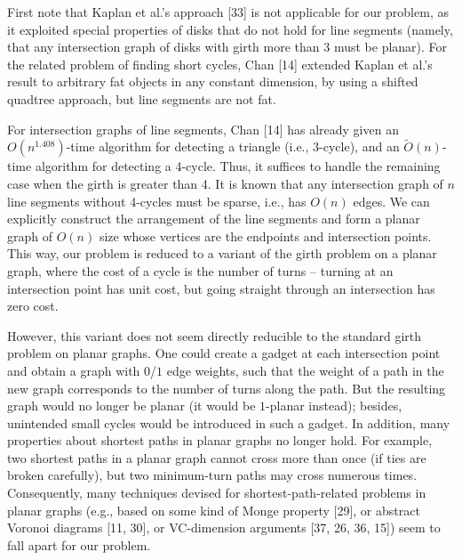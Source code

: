 First note that Kaplan et al.’s approach [33] is not applicable for our problem, as it exploited special properties of disks that do not hold for line segments (namely, that any intersection graph of disks with girth more than 3 must be planar). For the related problem of finding short cycles, Chan [14] extended Kaplan et al.’s result to arbitrary fat objects in any constant dimension, by using a shifted quadtree approach, but line segments are not fat.
\par
\par
For intersection graphs of line segments, Chan [14] has already given an $O(n^{1.408})$-time algorithm for detecting a triangle (i.e., 3-cycle), and an $\widetilde{O}(n)$-time algorithm for detecting a 4-cycle. Thus, it suffices to handle the remaining case when the girth is greater than 4. It is known that any intersection graph of $n$ line segments without 4-cycles must be sparse, i.e., has $O(n)$ edges. We can explicitly construct the arrangement of the line segments and form a planar graph of $O(n)$ size whose vertices are the endpoints and intersection points. This way, our problem is reduced to a variant of the girth problem on a planar graph, where the cost of a cycle is the number of turns – turning at an intersection point has unit cost, but going straight through an intersection has zero cost.
\par
\par
However, this variant does not seem directly reducible to the standard girth problem on planar graphs. One could create a gadget at each intersection point and obtain a graph with $0$/$1$ edge weights, such that the weight of a path in the new graph corresponds to the number of turns along the path. But the resulting graph would no longer be planar (it would be $1$-planar instead); besides, unintended small cycles would be introduced in such a gadget. In addition, many properties about shortest paths in planar graphs no longer hold. For example, two shortest paths in a planar graph cannot cross more than once (if ties are broken carefully), but two minimum-turn paths may cross numerous times. Consequently, many techniques devised for shortest-path-related problems in planar graphs (e.g., based on some kind of Monge property [29], or abstract Voronoi diagrams [11, 30], or VC-dimension arguments [37, 26, 36, 15]) seem to fall apart for our problem.
\par
\par
